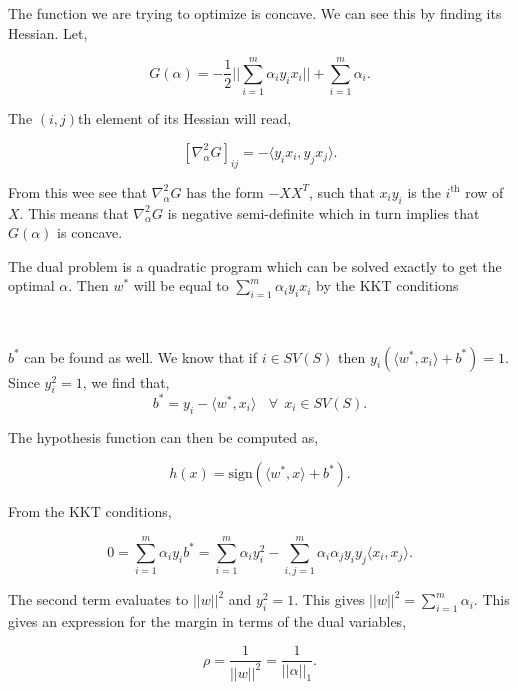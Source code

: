 \documentclass[a4paper,english,12pt]{article}
\begin{document}
The function we are trying to optimize is concave. We can see this by finding its Hessian. Let,

$$ G(\alpha) = -\frac12 || \sum_{i =1}^m \alpha_i y_i x_i || + \sum_{i = 1}^{m} \alpha_ i. $$

The $(i,j)$th element of its Hessian will read,

$$ [\nabla^2_\alpha G]_{ij} =  - \langle y_i x_i, y_j x_j \rangle. $$

From this wee see that $\nabla^2_\alpha G$ has the form $- XX^T$, such that $x_i y_i$ is the $i^{\text{th}}$ row of $X$. This means that $\nabla^2_\alpha G$ is negative semi-definite which in turn implies that $G(\alpha)$ is concave.

The dual problem is a quadratic program which can be solved exactly to get the optimal $\alpha$.  Then $w^*$ will be equal  to $\sum_{i =  1}^m \alpha_i y_i x_i $ by the KKT conditions

~

\begin{note}
$b^*$ can be found as well. We know that if $i \in SV(S)$ then $y_i(\langle w^*,x_i \rangle + b^* ) =  1$. Since $y_i^2 = 1$, we find that,
\begin{equation}
b^* =  y_i - \langle w^*, x_i \rangle ~~~~\forall ~~ x_i \in SV(S).
\end{equation}
\end{note}

\begin{note}
The hypothesis function can then be computed as,

\begin{equation}
h(x) =  \text{sign}(\langle w^*, x \rangle +  b^*).
\end{equation}
\end{note}

\begin{note}

From the KKT conditions,

\begin{equation}
0 =  \sum_{i = 1}^m \alpha_i y_i b^* =  \sum_{i = 1}^m \alpha_i y_i^2  -  \sum_{i,j = 1}^ m \alpha_i \alpha_j y_i y_j \langle x_i, x_j \rangle.
\end{equation}

The second term evaluates to $|| w||^2$ and $y_i^2 = 1$. This gives $ || w||^2 =  \sum_{i = 1}^m \alpha_i $. This gives an expression for the margin in terms of the dual variables,

\begin{equation}
\rho =  \frac{1}{|| w|| ^2} =  \frac{1}{|| \alpha ||_1}.
\end{equation} 
\end{note}
\end{document}
